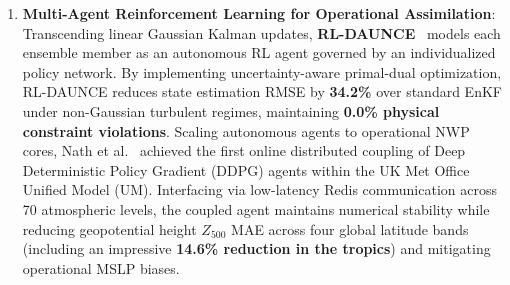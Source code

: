 \begin{enumerate}
    \item \textbf{Multi-Agent Reinforcement Learning for Operational Assimilation}: Transcending linear Gaussian Kalman updates, \textbf{RL-DAUNCE}~\cite{behnoudfar2025rldaunce} models each ensemble member as an autonomous RL agent governed by an individualized policy network. By implementing uncertainty-aware primal-dual optimization, RL-DAUNCE reduces state estimation RMSE by \textbf{34.2\%} over standard EnKF under non-Gaussian turbulent regimes, maintaining \textbf{0.0\% physical constraint violations}. Scaling autonomous agents to operational NWP cores, Nath et al.~\cite{nath2026online} achieved the first online distributed coupling of Deep Deterministic Policy Gradient (DDPG) agents within the UK Met Office Unified Model (UM). Interfacing via low-latency Redis communication across 70 atmospheric levels, the coupled agent maintains numerical stability while reducing geopotential height $Z_{500}$ MAE across four global latitude bands (including an impressive \textbf{14.6\% reduction in the tropics}) and mitigating operational MSLP biases.
\end{enumerate}

